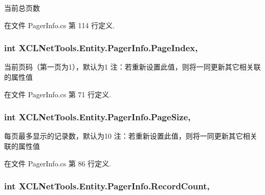 当前总页数 



在文件 Pager\-Info.\-cs 第 114 行定义.

\hypertarget{class_x_c_l_net_tools_1_1_entity_1_1_pager_info_a2cd0abb6744c59bbd9b98c758a023ac5}{
\subsubsection[{Page\-Index}]{\setlength{\rightskip}{0pt plus 5cm}int X\-C\-L\-Net\-Tools.\-Entity.\-Pager\-Info.\-Page\-Index\hspace{0.3cm}{\ttfamily [get]}, {\ttfamily [set]}}}\label{class_x_c_l_net_tools_1_1_entity_1_1_pager_info_a2cd0abb6744c59bbd9b98c758a023ac5}


当前页码（第一页为1），默认为1 注：若重新设置此值，则将一同更新其它相关联的属性值 



在文件 Pager\-Info.\-cs 第 71 行定义.

\hypertarget{class_x_c_l_net_tools_1_1_entity_1_1_pager_info_af9b5f737263571d79ead065f6faaa5ca}{
\subsubsection[{Page\-Size}]{\setlength{\rightskip}{0pt plus 5cm}int X\-C\-L\-Net\-Tools.\-Entity.\-Pager\-Info.\-Page\-Size\hspace{0.3cm}{\ttfamily [get]}, {\ttfamily [set]}}}\label{class_x_c_l_net_tools_1_1_entity_1_1_pager_info_af9b5f737263571d79ead065f6faaa5ca}


每页最多显示的记录数，默认为10 注：若重新设置此值，则将一同更新其它相关联的属性值 



在文件 Pager\-Info.\-cs 第 86 行定义.

\hypertarget{class_x_c_l_net_tools_1_1_entity_1_1_pager_info_a5617d4aaafa80fa664f13cfe7fbc1a6c}{
\subsubsection[{Record\-Count}]{\setlength{\rightskip}{0pt plus 5cm}int X\-C\-L\-Net\-Tools.\-Entity.\-Pager\-Info.\-Record\-Count\hspace{0.3cm}{\ttfamily [get]}, {\ttfamily [set]}}}\label{class_x_c_l_net_tools_1_1_entity_1_1_pager_info_a5617d4aaafa80fa664f13cfe7fbc1a6c}



